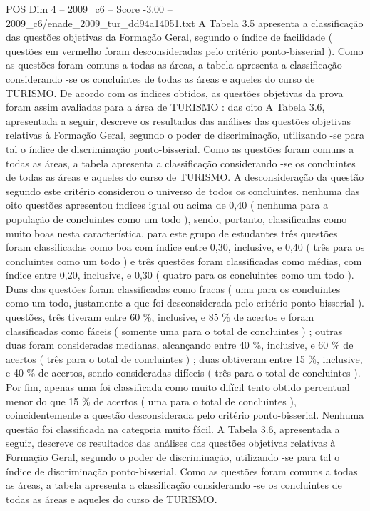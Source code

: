 \begin{textsample}{POS Dim 4 – 2009\_c6 – Score -3.00 – 2009\_c6/enade\_2009\_tur\_dd94a14051.txt}
A Tabela 3.5 apresenta a classificação das questões objetivas da Formação Geral, segundo o índice de facilidade ( questões em vermelho foram desconsideradas pelo critério ponto-bisserial ).
Como as questões foram comuns a todas as áreas, a tabela apresenta a classificação considerando -se os concluintes de todas as áreas e aqueles do curso de TURISMO.
De acordo com os índices obtidos, as questões objetivas da prova foram assim avaliadas para a área de TURISMO : das oito A Tabela 3.6, apresentada a seguir, descreve os resultados das análises das questões objetivas relativas à Formação Geral, segundo o poder de discriminação, utilizando -se para tal o índice de discriminação ponto-bisserial.
Como as questões foram comuns a todas as áreas, a tabela apresenta a classificação considerando -se os concluintes de todas as áreas e aqueles do curso de TURISMO.
A desconsideração da questão segundo este critério considerou o universo de todos os concluintes. nenhuma das oito questões apresentou índices igual ou acima de 0,40 ( nenhuma para a população de concluintes como um todo ), sendo, portanto, classificadas como muito boas nesta característica, para este grupo de estudantes três questões foram classificadas como boa com índice entre 0,30, inclusive, e 0,40 ( três para os concluintes como um todo ) e três questões foram classificadas como médias, com índice entre 0,20, inclusive, e 0,30 ( quatro para os concluintes como um todo ).
Duas das questões foram classificadas como fracas ( uma para os concluintes como um todo, justamente a que foi desconsiderada pelo critério ponto-bisserial ). questões, três tiveram entre 60 \%, inclusive, e 85 \% de acertos e foram classificadas como fáceis ( somente uma para o total de concluintes ) ; outras duas foram consideradas medianas, alcançando entre 40 \%, inclusive, e 60 \% de acertos ( três para o total de concluintes ) ; duas obtiveram entre 15 \%, inclusive, e 40 \% de acertos, sendo consideradas difíceis ( três para o total de concluintes ).
Por fim, apenas uma foi classificada como muito difícil tento obtido percentual menor do que 15 \% de acertos ( uma para o total de concluintes ), coincidentemente a questão desconsiderada pelo critério ponto-bisserial.
Nenhuma questão foi classificada na categoria muito fácil.
A Tabela 3.6, apresentada a seguir, descreve os resultados das análises das questões objetivas relativas à Formação Geral, segundo o poder de discriminação, utilizando -se para tal o índice de discriminação ponto-bisserial.
Como as questões foram comuns a todas as áreas, a tabela apresenta a classificação considerando -se os concluintes de todas as áreas e aqueles do curso de TURISMO.

\end{textsample}
